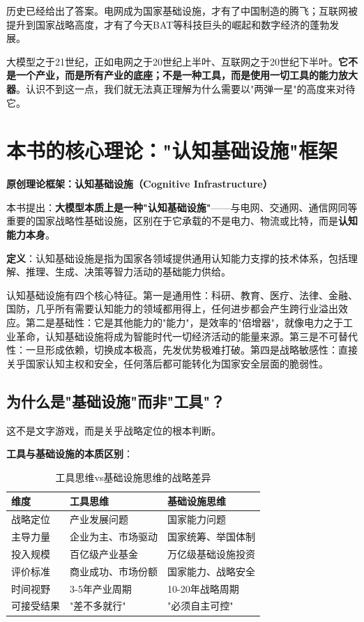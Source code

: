 历史已经给出了答案。电网成为国家基础设施，才有了中国制造的腾飞；互联网被提升到国家战略高度，才有了今天BAT等科技巨头的崛起和数字经济的蓬勃发展。

大模型之于21世纪，正如电网之于20世纪上半叶、互联网之于20世纪下半叶。\textbf{它不是一个产业，而是所有产业的底座；不是一种工具，而是使用一切工具的能力放大器}。认识不到这一点，我们就无法真正理解为什么需要以"两弹一星"的高度来对待它。

\section{本书的核心理论："认知基础设施"框架}

\textbf{原创理论框架：认知基础设施（Cognitive Infrastructure）}

本书提出：\textbf{大模型本质上是一种"认知基础设施"}——与电网、交通网、通信网同等重要的国家战略性基础设施，区别在于它承载的不是电力、物流或比特，而是\textbf{认知能力本身}。

\textbf{定义}：认知基础设施是指为国家各领域提供通用认知能力支撑的技术体系，包括理解、推理、生成、决策等智力活动的基础能力供给。

认知基础设施有四个核心特征。第一是通用性：科研、教育、医疗、法律、金融、国防，几乎所有需要认知能力的领域都用得上，任何进步都会产生跨行业溢出效应。第二是基础性：它是其他能力的"能力"，是效率的"倍增器"，就像电力之于工业革命，认知基础设施将成为智能时代一切经济活动的能量来源。第三是不可替代性：一旦形成依赖，切换成本极高，先发优势极难打破。第四是战略敏感性：直接关乎国家认知主权和安全，任何落后都可能转化为国家安全层面的脆弱性。

\subsection{为什么是"基础设施"而非"工具"？}

这不是文字游戏，而是关乎战略定位的根本判断。

\textbf{工具与基础设施的本质区别}：

\begin{table}[H]
\centering
\caption{工具思维vs基础设施思维的战略差异}
\small
\begin{tabular}{p{2.5cm}p{5cm}p{5cm}}
\toprule
\textbf{维度} & \textbf{工具思维} & \textbf{基础设施思维} \\
\midrule
战略定位 & 产业发展问题 & 国家能力问题 \\
主导力量 & 企业为主、市场驱动 & 国家统筹、举国体制 \\
投入规模 & 百亿级产业基金 & 万亿级基础设施投资 \\
评价标准 & 商业成功、市场份额 & 国家能力、战略安全 \\
时间视野 & 3-5年产业周期 & 10-20年战略周期 \\
可接受结果 & "差不多就行" & "必须自主可控" \\
\bottomrule
\end{tabular}
\end{table}

